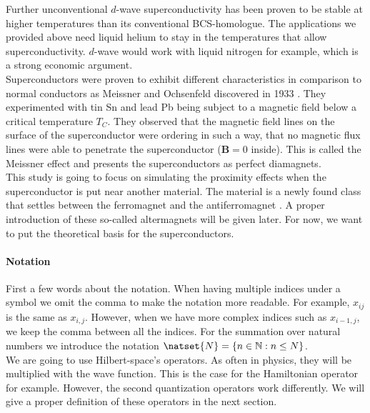 \documentclass[../main.tex]{subfile}
\begin{document}
Further unconventional $d$-wave superconductivity has been proven to be stable at higher temperatures than its conventional BCS-homologue.
The applications we provided above need liquid helium to stay in the temperatures that allow superconductivity. $d$-wave
would work with liquid nitrogen for example, which is a strong economic argument.\\

Superconductors were proven to exhibit different characteristics in comparison to normal conductors as
Meissner and Ochsenfeld discovered in 1933 \cite{MeissnerOchsenfeld1933}. 
They experimented with tin Sn and lead Pb being subject to a magnetic field below a critical temperature $T_C$. They observed that the magnetic field lines on the surface
of the superconductor were ordering in such a way, that no magnetic flux lines were able to penetrate the superconductor ($\bm{B} = 0$ inside). This is called the Meissner effect
and presents the superconductors as perfect diamagnets.\\

This study is going to focus on simulating the proximity effects when the superconductor is put near another material. The material is a newly found class 
that settles between the ferromagnet and the antiferromagnet \cite{Smejkal2022}. A proper introduction of these so-called altermagnets will be given later.
For now, we want to put the theoretical basis for the superconductors.\\

\paragraph{Notation}$~$\\

First a few words about the notation. When having multiple indices under a symbol we omit the comma to make the notation more readable. 
For example, $x_{ij}$ is the same as $x_{i,j}$. However, when we have more complex indices such as $x_{i-1, j}$, we keep the comma between all
the indices. For the summation over natural numbers we introduce the notation $\natset{N} = \{n \in \mathbb{N}: n\leq N\}$.\\

We are going to use Hilbert-space's operators. As often in physics, they will be multiplied with the wave function. This is the case for the Hamiltonian 
operator for example. However, the second quantization operators work differently. We will give a proper definition of these operators in the next section.\\
\end{document}
